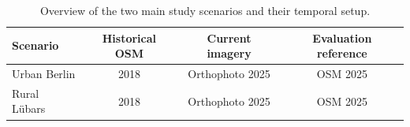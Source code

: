 \begin{table}[htbp]
\centering
\caption{Overview of the two main study scenarios and their temporal setup.}
\label{tab:dataset_overview}
\begin{tabular}{p{3cm}ccc}
\toprule
Scenario & Historical OSM & Current imagery & Evaluation reference \\
\midrule
Urban Berlin & 2018 & Orthophoto 2025 & OSM 2025 \\
Rural Lübars & 2018 & Orthophoto 2025 & OSM 2025 \\
\bottomrule
\end{tabular}
\end{table}